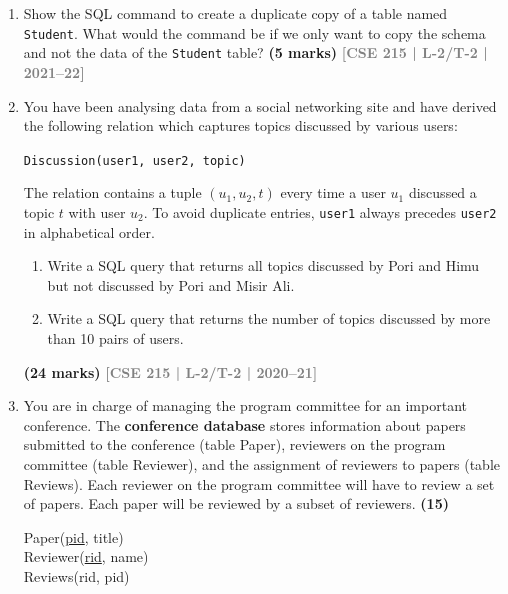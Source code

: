 \documentclass[12pt,a3paper]{article}
\newcommand{\yr}[1]{\hfill\textcolor{gray}{\small\textbf{[#1]}}}
\newcommand{\mk}[1]{\textcolor{orange!70!black}{\small\textbf{(#1 marks)}}}
\begin{document}
\begin{enumerate}
\item Show the SQL command to create a duplicate copy of a table named \texttt{Student}. What would the command be if we only want to copy the schema and not the data of the \texttt{Student} table?
\mk{5} \yr{CSE 215 | L-2/T-2 | 2021--22}

\item You have been analysing data from a social networking site and have derived the following relation which captures topics discussed by various users:
\begin{center}
\texttt{Discussion(user1, user2, topic)}
\end{center}
The relation contains a tuple $(u_1, u_2, t)$ every time a user $u_1$ discussed a topic $t$ with user $u_2$. To avoid duplicate entries, \texttt{user1} always precedes \texttt{user2} in alphabetical order.
\begin{enumerate}
  \item Write a SQL query that returns all topics discussed by Pori and Himu but not discussed by Pori and Misir Ali.
  \item Write a SQL query that returns the number of topics discussed by more than 10 pairs of users.
\end{enumerate}
\mk{24} \yr{CSE 215 | L-2/T-2 | 2020--21}

\item You are in charge of managing the program committee for an important conference. The \textbf{conference database} stores information about papers submitted to the conference (table Paper), reviewers on the program committee (table Reviewer), and the assignment of reviewers to papers (table Reviews). Each reviewer on the program committee will have to review a set of papers. Each paper will be reviewed by a subset of reviewers. \hfill \textbf{(15)}

\vspace{0.2cm}
\noindent Paper(\underline{pid}, title) \\
Reviewer(\underline{rid}, name) \\
Reviews(rid, pid)
\vspace{0.2cm}


\end{enumerate}
\end{document}
